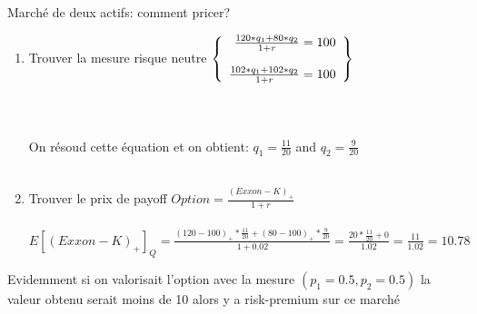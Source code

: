 \documentclass[10pt]{beamer}
\begin{document}
\begin{frame}{Marché de deux actifs: comment pricer?}{}
\small{
    \begin{enumerate}
      \item Trouver la mesure risque neutre
      \begin{math}
       
        \left\{
        \begin{array}{r c l}

            \frac{120*q_{1} + 80*q_{2}}{1+r} = 100 \\~\\ 

            \frac{102*q_{1} + 102*q_{2}}{1+r} = 100 \\ 
       \end{array}
       \right\}
      \end{math} \\~\\ \\~\\
  
    On résoud cette équation et on obtient: $q_{1} = \frac{11}{20}$ and $q_{2} = \frac{9}{20}$ \\~\\
  
      \item Trouver le prix de payoff $Option = \frac{(Exxon-K)_{+}}{1+r}$ \\~\\
      
      $E[(Exxon-K)_{+}]_{Q} = \frac{(120-100)_{+}*\frac{11}{20} + (80-100)_{+}*\frac{9}{20}}{1+0.02} = \frac{20*\frac{11}{20}+0}{1.02} = \frac{11}{1.02} = 10.78$
    \end{enumerate}
      
  }
  
  Evidemment si on valorisait l'option avec la mesure $(p_{1} = 0.5, p_{2} = 0.5)$ la valeur obtenu serait moins de 10 alors y a risk-premium sur ce marché
  
\end{frame}
\end{document}
